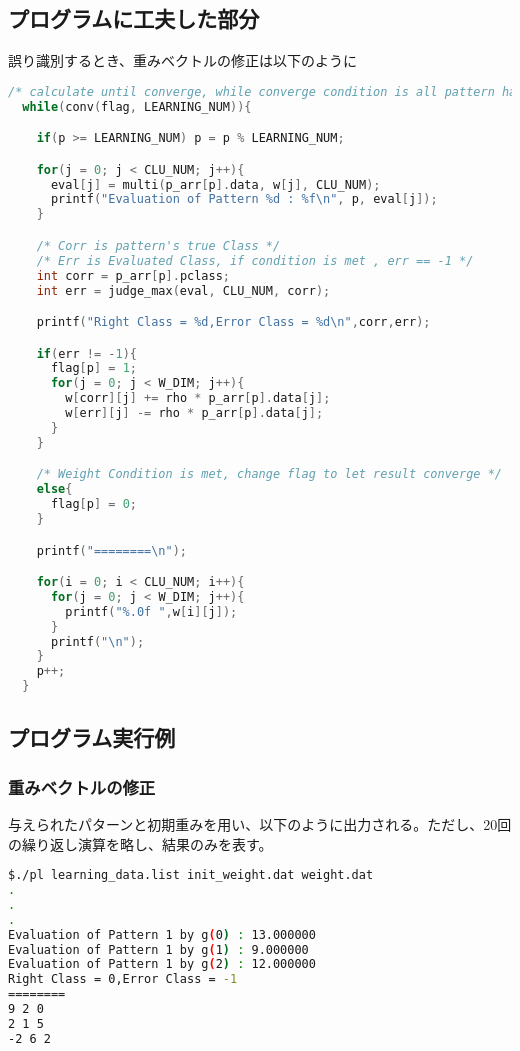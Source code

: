 \documentclass[ %
  uplatex,%
  papersize%
]{jsarticle}
\begin{document}
\subsection{プログラムに工夫した部分}
誤り識別するとき、重みベクトルの修正は以下のように
\begin{lstlisting}[language=c,caption=correct weight vector,]
 /* calculate until converge, while converge condition is all pattern have become stable */
  while(conv(flag, LEARNING_NUM)){

    if(p >= LEARNING_NUM) p = p % LEARNING_NUM;

    for(j = 0; j < CLU_NUM; j++){
      eval[j] = multi(p_arr[p].data, w[j], CLU_NUM);
      printf("Evaluation of Pattern %d : %f\n", p, eval[j]);
    }

    /* Corr is pattern's true Class */
    /* Err is Evaluated Class, if condition is met , err == -1 */
    int corr = p_arr[p].pclass;
    int err = judge_max(eval, CLU_NUM, corr);

    printf("Right Class = %d,Error Class = %d\n",corr,err);

    if(err != -1){
      flag[p] = 1;
      for(j = 0; j < W_DIM; j++){
        w[corr][j] += rho * p_arr[p].data[j];
        w[err][j] -= rho * p_arr[p].data[j];
      }
    }

    /* Weight Condition is met, change flag to let result converge */
    else{
      flag[p] = 0;
    }

    printf("========\n");

    for(i = 0; i < CLU_NUM; i++){
      for(j = 0; j < W_DIM; j++){
        printf("%.0f ",w[i][j]);
      }
      printf("\n");
    }
    p++;
  }
\end{lstlisting}

\subsection{プログラム実行例}
\subsubsection{重みベクトルの修正}
与えられたパターンと初期重みを用い、以下のように出力される。ただし、20回の繰り返し演算を略し、結果のみを表す。
\begin{lstlisting}[language=bash]
$./pl learning_data.list init_weight.dat weight.dat
.
.
.
Evaluation of Pattern 1 by g(0) : 13.000000
Evaluation of Pattern 1 by g(1) : 9.000000
Evaluation of Pattern 1 by g(2) : 12.000000
Right Class = 0,Error Class = -1
========
9 2 0
2 1 5
-2 6 2
\end{lstlisting}
\end{document}
